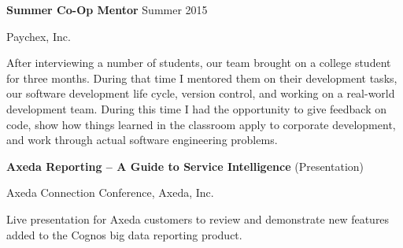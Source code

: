 \documentclass[letterpaper,MMMMyyyy,nonstopmode]{simpleresumecv}
\begin{document}
\begin{Body}
\BigGap
\Entry
\textbf{Summer Co-Op Mentor}
\hfill
Summer 2015

Paychex, Inc.
\begin{Detail}
\Item
After interviewing a number of students, our team brought on a college student for three months. During that time I mentored them on their development tasks, our software development life cycle, version control, and working on a real-world development team. During this time I had the opportunity to give feedback on code, show how things learned in the classroom apply to corporate development, and work through actual software engineering problems.
\end{Detail}
\fi      %

\BigGap
\Entry
\textbf{Axeda Reporting -- A Guide to Service Intelligence} (Presentation)
\hfill
{}

Axeda Connection Conference, Axeda, Inc.
\begin{Detail}
\Item
Live presentation for Axeda customers to review and demonstrate new features added to the Cognos big data reporting product.
\iffalse
\Item
From the conference program:
\begin{quote}
Service Intelligence enables your organization to apply analytics and decision-making, anytime, anywhere. See an overview of Axeda Reporting and what changes are coming in the near future. This session will include live demos of standard reports, as well creating custom reports with Report Studio.
\end{quote}
\fi
\end{Detail}

\iffalse      %
\BigGap
\Entry
\textbf{Java Technical Lead and Team Lead}
\hfill
\DatestampY{2005} -- 
\DatestampY{2010}

Paychex, Inc.
\begin{Detail}
\BulletItem
As one of the technical leads for Java, developers on the extended team would come to me when they had deep technical questions about their code or odd errors that they couldn't track down. I would also have conversations with experienced developers to determine the ``best'' solution for a problem that would meet given technical or scheduling constraints.
\BulletItem
The department I was in created training exercises for new developers to introduce them to the tools and development environment. I worked with each new developer to review their answers to the Java exercises,  answer questions as they worked through them, and working through topics new to them.
\BulletItem
I gave quarterly presentations to the extended team to introduce Java technologies and internal systems. Topics included web application redesigns and base functionality, Java JSP and servlet development, and web testing techniques.
\BulletItem
As a Java team lead, I was responsible for a small team of developers. Since this was the first job after college for some, as we reviewed their code I would see opportunities to mentor them on advanced Java and JavaScript concepts and topics.
\end{Detail}
\fi      %


\end{Body}
\end{document}
